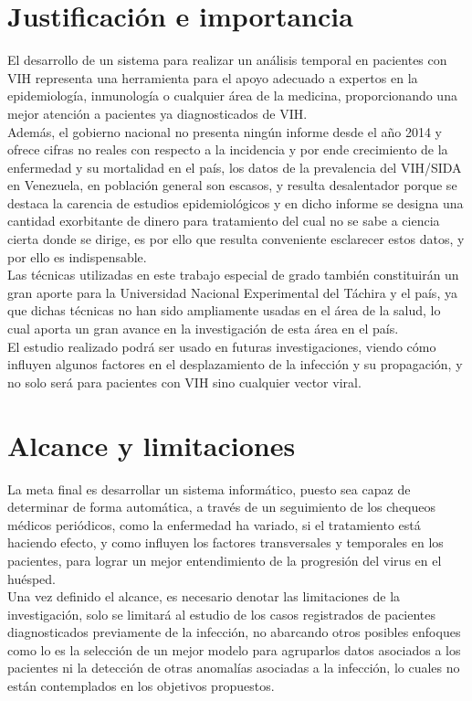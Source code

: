 \section{Justificaci\'on e importancia}

	El desarrollo de un sistema para realizar un an\'alisis temporal en pacientes con VIH representa una herramienta para el apoyo adecuado a expertos en la epidemiolog\'ia, inmunolog\'ia o cualquier \'area de la medicina, proporcionando una mejor atenci\'on a pacientes ya diagnosticados de VIH.\\

	Adem\'as, el gobierno nacional no presenta ning\'un informe desde el a\~no 2014 y ofrece cifras no reales con respecto a la incidencia y por ende crecimiento de la enfermedad y su mortalidad en el pa\'is, los datos de la prevalencia del VIH/SIDA en Venezuela, en poblaci\'on general son escasos, y resulta desalentador porque se destaca la carencia de estudios epidemiol\'ogicos \textit{\citet{alerta}} y en dicho informe se designa una cantidad exorbitante de dinero para tratamiento del cual no se sabe a ciencia cierta donde se dirige, es por ello que resulta conveniente esclarecer estos datos, y por ello es indispensable. \\
		
	Las t\'ecnicas utilizadas en este trabajo especial de grado tambi\'en constituir\'an un gran aporte para la Universidad Nacional Experimental del T\'achira y el pa\'is, ya que dichas t\'ecnicas no han sido ampliamente usadas en el \'area de la salud, lo cual aporta un gran avance en la investigaci\'on de esta \'area en el pa\'is. \\

	El estudio realizado podr\'a ser usado en futuras investigaciones, viendo c\'omo influyen algunos factores en el desplazamiento de la infecci\'on y su propagaci\'on, y no solo ser\'a para pacientes con VIH sino cualquier vector viral.
	
\section{Alcance y limitaciones}

	La meta final es desarrollar un sistema inform\'atico, puesto sea capaz de determinar de forma autom\'atica, a trav\'es de un seguimiento de los chequeos m\'edicos peri\'odicos, como la enfermedad ha variado, si el tratamiento est\'a haciendo efecto, y como influyen los factores transversales y temporales en los pacientes, para lograr un mejor entendimiento de la progresi\'on del virus en el hu\'esped. \\
	
	Una vez definido el alcance, es necesario denotar las limitaciones de la investigaci\'on, solo se limitar\'a al estudio de los casos registrados de pacientes diagnosticados previamente de la infecci\'on, no abarcando otros posibles enfoques como lo es la selecci\'on de un mejor modelo para agruparlos datos asociados a los pacientes ni la detecci\'on de otras anomal\'ias asociadas a la infecci\'on, lo cuales no est\'an contemplados en los objetivos propuestos.